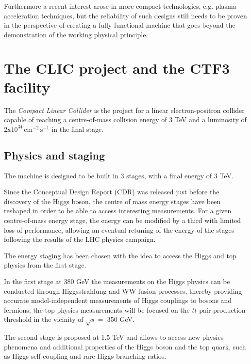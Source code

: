 Furthermore a recent interest arose in more compact technologies, e.g. plasma acceleration techniques, but the reliability of such designs still needs to be proven in the perspective of creating a fully functional machine that goes beyond the demonstration of the working physical principle.



\section{The CLIC project and the CTF3 facility}

The \textit{Compact Linear Collider} is the project for a linear electron-positron collider capable of reaching a centre-of-mass collision energy of 3 TeV and a luminosity of $2\text{x}10^{34} \, \text{cm}^{-2} \, \text{s}^{-1}$ in the final stage.

\subsection{Physics and staging}

The machine is designed to be built in 3 stages, with a final energy of 3 TeV. 

Since the Conceptual Design Report (CDR)\cite{CLIC:cdr} was released just before the discovery of the Higgs boson, the centre of mass energy stages have been reshaped in order to be able to access interesting measurements. For a given centre-of-mass energy stage, the energy can be modified by a third with limited loss of performance\cite{CLIC:cdrVol3}, allowing an eventual retuning of the energy of the stages following the results of the LHC physics campaign.

The energy staging has been chosen with the idea to access the Higgs and top physics from the first stage.\cite{CLIC:staging2016,Bozovic-Jelisavcic:2160172}

In the first stage at 380 GeV the measurements on the Higgs physics can be conducted through Higgsstrahlung and WW-fusion processes, thereby providing accurate model-independent measurements of Higgs couplings to bosons and fermions\cite{Roloff:2210491}; the top physics measurements will be focused on the $t\bar{t}$ pair production threshold in the vicinity of $\sqrt{s} = $ 350 GeV.

The second stage is proposed at 1.5 TeV and allows to access new physics phenomena and additional properties of the Higgs boson and the top quark, such as Higgs self-coupling and rare Higgs branching ratios.

